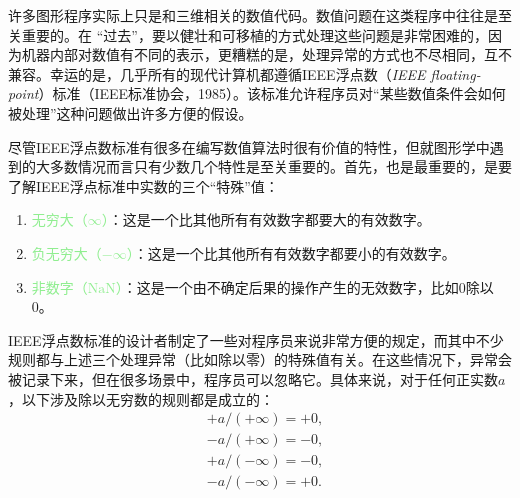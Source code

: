 \documentclass[lang=cn,12pt,marginpar=margintrue]{elegantbook}
\begin{document}
许多图形程序实际上只是和三维相关的数值代码。数值问题在这类程序中往往是至关重要的。在 “过去”，要以健壮和可移植的方式处理这些问题是非常困难的，因为机器内部对数值有不同的表示，更糟糕的是，处理异常的方式也不尽相同，互不兼容。幸运的是，几乎所有的现代计算机都遵循IEEE浮点数（\textit{IEEE floating-point}）标准（IEEE标准协会，1985）。该标准允许程序员对“某些数值条件会如何被处理”这种问题做出许多方便的假设。

尽管IEEE浮点数标准有很多在编写数值算法时很有价值的特性，但就图形学中遇到的大多数情况而言只有少数几个特性是至关重要的。首先，也是最重要的，是要了解IEEE浮点标准中实数的三个“特殊”值：
\begin{enumerate}
  \item \textcolor{lightgreen}{无穷大（$\infty$）}：这是一个比其他所有有效数字都要大的有效数字。
  \item \textcolor{lightgreen}{负无穷大（$-\infty$）}：这是一个比其他所有有效数字都要小的有效数字。
  \item \textcolor{lightgreen}{非数字（$\mathrm{NaN}$）}：这是一个由不确定后果的操作产生的无效数字，比如0除以0。
\end{enumerate}


IEEE浮点数标准的设计者制定了一些对程序员来说非常方便的规定，而其中不少规则都与上述三个处理异常（比如除以零）的特殊值有关。在这些情况下，异常会被记录下来，但在很多场景中，程序员可以忽略它。具体来说，对于任何正实数$a$，以下涉及除以无穷数的规则都是成立的：
\[
  \begin{aligned}
     & +a /(+\infty)=+0, \\
     & -a /(+\infty)=-0, \\
     & +a /(-\infty)=-0, \\
     & -a /(-\infty)=+0.
  \end{aligned}
\]
\end{document}

